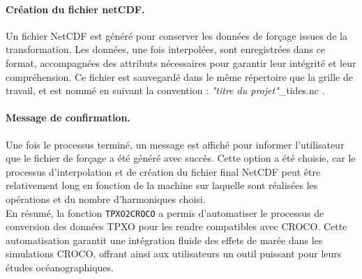 \paragraph{Création du fichier netCDF.\\}

Un fichier NetCDF est généré pour conserver les données de forçage issues de la transformation. Les données, une fois interpolées, sont enregistrées dans ce format, accompagnées des attributs nécessaires pour garantir leur intégrité et leur compréhension. Ce fichier est sauvegardé dans le même répertoire que la grille de travail, et est nommé en suivant la convention : \og \textit{"titre du projet"}\_tides.nc \fg{}.


\paragraph{Message de confirmation.\\}

Une fois le processus terminé, un message est affiché pour informer l'utilisateur que le fichier de forçage a été généré avec succès. Cette option a été choisie, car le processus d'interpolation et de création du fichier final NetCDF peut être relativement long en fonction de la machine sur laquelle sont réalisées les opérations et du nombre d'harmoniques choisi.\\

En résumé, la fonction \texttt{TPXO2CROCO} a permis d'automatiser le processus de conversion des données TPXO pour les rendre compatibles avec CROCO. Cette automatisation garantit une intégration fluide des effets de marée dans les simulations CROCO, offrant ainsi aux utilisateurs un outil puissant pour leurs études océanographiques.

